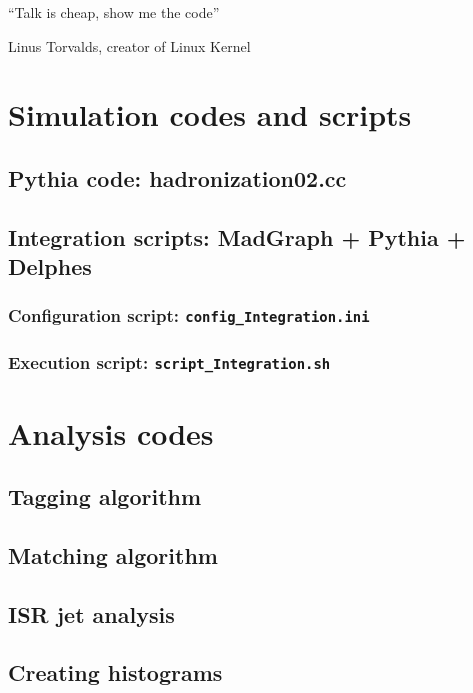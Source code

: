 \documentclass[12pt, oneside]{book}              %
\begin{document}
\begin{appendices}

\epigraph{\textquotedblleft Talk is cheap, show me the code\textquotedblright}{Linus Torvalds, creator of Linux Kernel}

\chapter[Simulation codes]{Simulation codes and scripts}\label{App:Simulation_codes}
\section[Pythia code]{Pythia code: hadronization02.cc}\label{App:hadronization02.cc}

\newpage
\section[Integration scripts]{Integration scripts: MadGraph + Pythia + Delphes}\label{App:scripts}
\subsection{Configuration script: \texttt{config\_Integration.ini}}\label{sub:Configuration_script}

\subsection{Execution script: \texttt{script\_Integration.sh}}\label{sub:Execution_script}


\chapter[Analysis codes]{Analysis codes}\label{App:Analysis_codes}
\section[Tagging algorithm]{Tagging algorithm}\label{App:Tagging_code}

\section[Matching algorithm]{Matching algorithm}\label{App:Matching_code}

\section[ISR jet analysis]{ISR jet analysis}\label{App:ISR_analysis}

\section[Creating histograms]{Creating histograms}\label{App:Creating_histos_code}



\end{appendices}




	
\end{document}

